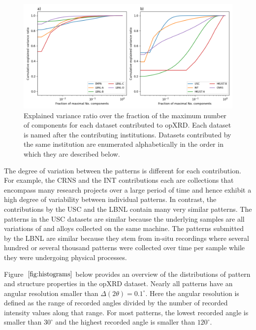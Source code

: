 \begin{figure}[!htb]
    \centering
    \includegraphics[width=\linewidth]{figures/component_fractions.png}
    \caption{Explained variance ratio over the fraction of the maximum number of components for each dataset contributed to opXRD. Each dataset is named after the contributing institutions. Datasets contributed by the same institution are enumerated alphabetically in the order in which they are described below. }
    \label{fig:components}
\end{figure}

The degree of variation between the patterns is different for each contribution. For example, the CRNS and the INT contributions each are collections that encompass many research projects over a large period of time and hence exhibit a high degree of variability between individual patterns. In contrast, the contributions by the USC and the LBNL contain many very similar patterns. The patterns in the USC datasets are similar because the underlying samples are all variations of  and  alloys collected on the same machine. The patterns submitted by the LBNL are similar because they stem from in-situ recordings where several hundred or several thousand patterns were collected over time per sample while they were undergoing physical processes. \\

\pagebreak

Figure~$\eqref{fig:histograms}$ below provides an overview of the distributions of pattern and structure properties in the opXRD dataset. Nearly all patterns have an angular resolution smaller than $\Delta(2\theta) = 0.1 ^\circ$. Here the angular resolution is defined as the range of recorded angles divided by the number of recorded intensity values along that range. For most patterns, the lowest recorded angle is smaller than $30 ^\circ$ and the highest recorded angle is smaller than $120 ^\circ$.

